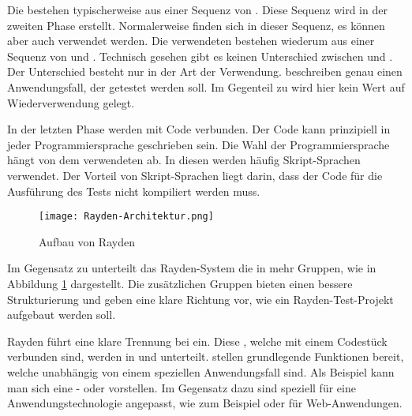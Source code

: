 \SuperPar
Die  bestehen typischerweise aus einer Sequenz von . Diese Sequenz wird in der zweiten Phase erstellt. Normalerweise finden sich  in dieser Sequenz, es können aber auch  verwendet werden. Die verwendeten  bestehen wiederum aus einer Sequenz von  und . Technisch gesehen gibt es keinen Unterschied zwischen  und . Der Unterschied besteht nur in der Art der Verwendung.  beschreiben genau einen Anwendungsfall, der getestet werden soll. Im Gegenteil zu  wird hier kein Wert auf Wiederverwendung gelegt.

\SuperPar
In der letzten Phase werden  mit Code verbunden. Der Code kann prinzipiell in jeder Programmiersprache geschrieben sein. Die Wahl der Programmiersprache hängt von dem verwendeten  ab. In diesen  werden häufig Skript-Sprachen verwendet. Der Vorteil von Skript-Sprachen liegt darin, dass der Code für die Ausführung des Tests nicht kompiliert werden muss.

\begin{figure}[h]
\centering
\texttt{[image: Rayden-Architektur.png]}
\caption{Aufbau von Rayden}
\label{fig:rayden-arch}
\end{figure}

\SuperPar
Im Gegensatz zu  unterteilt das Rayden-System die  in mehr Gruppen, wie in Abbildung \ref{fig:rayden-arch} dargestellt. Die zusätzlichen Gruppen bieten einen bessere Strukturierung und geben eine klare Richtung vor, wie ein Rayden-Test-Projekt aufgebaut werden soll.    

\SuperPar
Rayden führt eine klare Trennung bei  ein. Diese , welche mit einem Codestück verbunden sind, werden in  und  unterteilt.  stellen grundlegende Funktionen bereit, welche unabhängig von einem speziellen Anwendungsfall sind. Als Beispiel kann man sich eine - oder  vorstellen. Im Gegensatz dazu sind  speziell für eine Anwendungstechnologie angepasst, wie zum Beispiel  oder  für Web-Anwendungen. 

